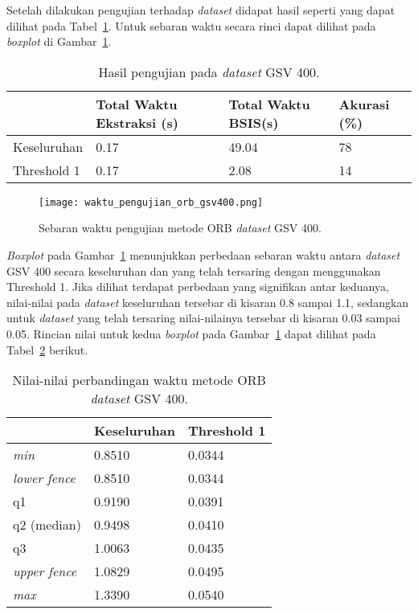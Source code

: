 Setelah dilakukan pengujian terhadap \textit{dataset} didapat hasil seperti yang dapat dilihat pada Tabel~\ref{tab:pengujian_orb_gsv400}. Untuk sebaran waktu secara rinci dapat dilihat pada \textit{boxplot} di Gambar~\ref{fig:waktu_pengujian_orb_gsv400}.
\begin{table}[H]
	\centering
	\begin{tabular}{|l|l|l|l|}
		\hline
		& \textbf{Total Waktu Ekstraksi (s)} & \textbf{Total Waktu BSIS(s)} & \textbf{Akurasi (\%)} \\ \hline
		Keseluruhan & 0.17 & 49.04                   & 78                    \\ \hline
		Threshold 1 & 0.17 & 2.08                    & 14                    \\ \hline
	\end{tabular}
	\caption{Hasil pengujian pada \textit{dataset} GSV 400.}
	\label{tab:pengujian_orb_gsv400}
\end{table}
\begin{figure}[H]
	\centering
	\texttt{[image: waktu\_pengujian\_orb\_gsv400.png]}
	\caption{Sebaran waktu pengujian metode ORB \textit{dataset} GSV 400.}
	\label{fig:waktu_pengujian_orb_gsv400}
\end{figure}

\textit{Boxplot} pada Gambar~\ref{fig:waktu_pengujian_orb_gsv400} menunjukkan perbedaan sebaran waktu antara \textit{dataset} GSV 400 secara keseluruhan dan yang telah tersaring dengan menggunakan Threshold 1. Jika dilihat terdapat perbedaan yang signifikan antar keduanya, nilai-nilai pada \textit{dataset} keseluruhan tersebar di kisaran 0.8 sampai 1.1, sedangkan untuk \textit{dataset} yang telah tersaring nilai-nilainya tersebar di kisaran 0.03 sampai 0.05. Rincian nilai untuk kedua \textit{boxplot} pada Gambar~\ref{fig:waktu_pengujian_orb_gsv400} dapat dilihat pada Tabel~\ref{tab:boxplot_gsv400_orb} berikut.
\begin{table}[H]
	\centering
	\begin{tabular}{|l|l|l|}
		\hline
		& \textbf{Keseluruhan} & \textbf{Threshold 1}         \\ \hline
		\textit{min}          & 0.8510 & 0.0344               \\ \hline
		\textit{lower fence}  & 0.8510 & 0.0344               \\ \hline
		q1                    & 0.9190 & 0.0391               \\ \hline
		q2 (median)           & 0.9498 & 0.0410               \\ \hline
		q3                    & 1.0063 & 0.0435               \\ \hline
		\textit{upper fence}  & 1.0829 & 0.0495               \\ \hline
		\textit{max}          & 1.3390 & 0.0540               \\ \hline
	\end{tabular}
	\caption{Nilai-nilai perbandingan waktu metode ORB \textit{dataset} GSV 400.}
	\label{tab:boxplot_gsv400_orb}
\end{table}


